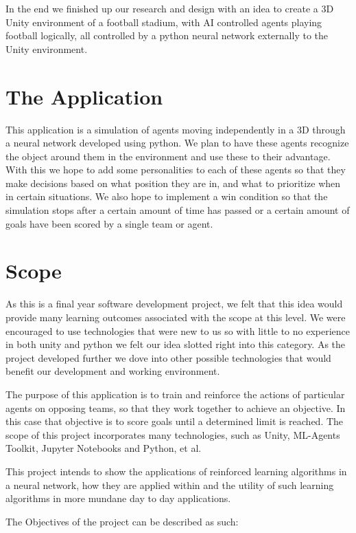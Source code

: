 In the end we finished up our research and design with an idea to create a 3D Unity environment of a football stadium, with AI controlled agents playing football logically, all controlled by a python neural network externally to the Unity environment.


\section{The Application}
This application is a simulation of agents moving independently in a 3D through a neural network developed using python. We plan to have these agents recognize the object around them in the environment and use these to their advantage. With this we hope to add some personalities to each of these agents so that they make decisions based on what position they are in, and what to prioritize when in certain situations. We also hope to implement a win condition so that the simulation stops after a certain amount of time has passed or a certain amount of goals have been scored by a single team or agent.

\section{Scope}
As this is a final year software development project, we felt that this idea would provide many learning outcomes associated with the scope at this level. We were encouraged to use technologies that were new to us so with little to no experience in both unity and python we felt our idea slotted right into this category. As the project developed further we dove into other possible technologies that would benefit our development and working environment.

The purpose of this application is to train and reinforce the actions of particular agents on opposing teams, so that they work together to achieve an objective. In this case that objective is to score goals until a determined limit is reached. The scope of this project incorporates many technologies, such as Unity, ML-Agents Toolkit, Jupyter Notebooks and Python, et al. 

This project intends to show the applications of reinforced learning algorithms in a neural network, how they are applied within and the utility of such learning algorithms in more mundane day to day applications.



The Objectives of the project can be described as such:

